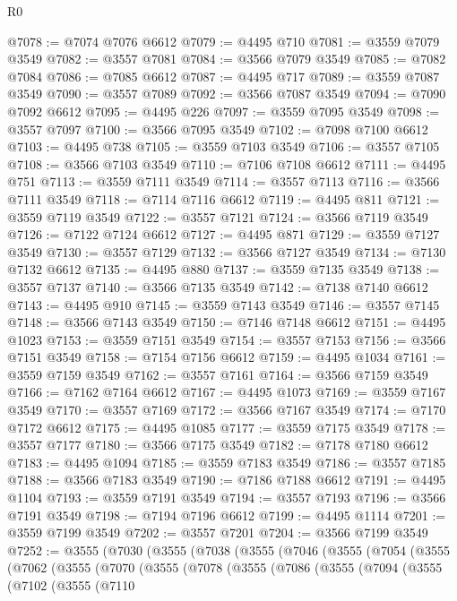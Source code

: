 \begin{lexlean}{R0}
\begin{coremodule}
@7078 := @7074 @7076 @6612
@7079 := @4495 @710
@7081 := @3559 @7079 @3549
@7082 := @3557 @7081
@7084 := @3566 @7079 @3549
@7085 := @7082 @7084
@7086 := @7085 @6612
@7087 := @4495 @717
@7089 := @3559 @7087 @3549
@7090 := @3557 @7089
@7092 := @3566 @7087 @3549
@7094 := @7090 @7092 @6612
@7095 := @4495 @226
@7097 := @3559 @7095 @3549
@7098 := @3557 @7097
@7100 := @3566 @7095 @3549
@7102 := @7098 @7100 @6612
@7103 := @4495 @738
@7105 := @3559 @7103 @3549
@7106 := @3557 @7105
@7108 := @3566 @7103 @3549
@7110 := @7106 @7108 @6612
@7111 := @4495 @751
@7113 := @3559 @7111 @3549
@7114 := @3557 @7113
@7116 := @3566 @7111 @3549
@7118 := @7114 @7116 @6612
@7119 := @4495 @811
@7121 := @3559 @7119 @3549
@7122 := @3557 @7121
@7124 := @3566 @7119 @3549
@7126 := @7122 @7124 @6612
@7127 := @4495 @871
@7129 := @3559 @7127 @3549
@7130 := @3557 @7129
@7132 := @3566 @7127 @3549
@7134 := @7130 @7132 @6612
@7135 := @4495 @880
@7137 := @3559 @7135 @3549
@7138 := @3557 @7137
@7140 := @3566 @7135 @3549
@7142 := @7138 @7140 @6612
@7143 := @4495 @910
@7145 := @3559 @7143 @3549
@7146 := @3557 @7145
@7148 := @3566 @7143 @3549
@7150 := @7146 @7148 @6612
@7151 := @4495 @1023
@7153 := @3559 @7151 @3549
@7154 := @3557 @7153
@7156 := @3566 @7151 @3549
@7158 := @7154 @7156 @6612
@7159 := @4495 @1034
@7161 := @3559 @7159 @3549
@7162 := @3557 @7161
@7164 := @3566 @7159 @3549
@7166 := @7162 @7164 @6612
@7167 := @4495 @1073
@7169 := @3559 @7167 @3549
@7170 := @3557 @7169
@7172 := @3566 @7167 @3549
@7174 := @7170 @7172 @6612
@7175 := @4495 @1085
@7177 := @3559 @7175 @3549
@7178 := @3557 @7177
@7180 := @3566 @7175 @3549
@7182 := @7178 @7180 @6612
@7183 := @4495 @1094
@7185 := @3559 @7183 @3549
@7186 := @3557 @7185
@7188 := @3566 @7183 @3549
@7190 := @7186 @7188 @6612
@7191 := @4495 @1104
@7193 := @3559 @7191 @3549
@7194 := @3557 @7193
@7196 := @3566 @7191 @3549
@7198 := @7194 @7196 @6612
@7199 := @4495 @1114
@7201 := @3559 @7199 @3549
@7202 := @3557 @7201
@7204 := @3566 @7199 @3549
@7252 := @3555
    (@7030
      (@3555
        (@7038
          (@3555
            (@7046
              (@3555
                (@7054
                  (@3555
                    (@7062
                      (@3555
                        (@7070
                          (@3555
                            (@7078
                              (@3555
                                (@7086
                                  (@3555
                                    (@7094
                                      (@3555
                                        (@7102
                                          (@3555
                                            (@7110

\end{coremodule}
\end{lexlean}
